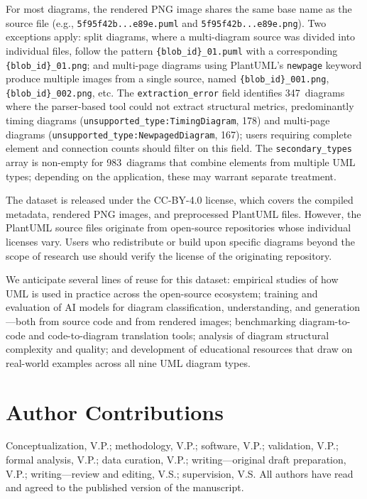 \documentclass[11pt]{article}
\begin{document}
For most diagrams, the rendered PNG image shares the same base name as the source file (e.g., \texttt{5f95f42b...e89e.puml} and \texttt{5f95f42b...e89e.png}). Two exceptions apply: split diagrams, where a multi-diagram source was divided into individual files, follow the pattern \texttt{\{blob\_id\}\_01.puml} with a corresponding \texttt{\{blob\_id\}\_01.png}; and multi-page diagrams using PlantUML's \texttt{newpage} keyword produce multiple images from a single source, named \texttt{\{blob\_id\}\_001.png}, \texttt{\{blob\_id\}\_002.png}, etc. The \texttt{extraction\_error} field identifies 347~diagrams where the parser-based tool could not extract structural metrics, predominantly timing diagrams (\texttt{unsupported\_type:TimingDiagram}, 178) and multi-page diagrams (\texttt{unsupported\_type:NewpagedDiagram}, 167); users requiring complete element and connection counts should filter on this field. The \texttt{secondary\_types} array is non-empty for 983~diagrams that combine elements from multiple UML types; depending on the application, these may warrant separate treatment.

The dataset is released under the CC-BY-4.0 license, which covers the compiled metadata, rendered PNG images, and preprocessed PlantUML files. However, the PlantUML source files originate from open-source repositories whose individual licenses vary. Users who redistribute or build upon specific diagrams beyond the scope of research use should verify the license of the originating repository.

We anticipate several lines of reuse for this dataset: empirical studies of how UML is used in practice across the open-source ecosystem; training and evaluation of AI models for diagram classification, understanding, and generation---both from source code and from rendered images; benchmarking diagram-to-code and code-to-diagram translation tools; analysis of diagram structural complexity and quality; and development of educational resources that draw on real-world examples across all nine UML diagram types.


\vspace{6pt}

\section*{Author Contributions}
Conceptualization, V.P.; methodology, V.P.; software, V.P.; validation, V.P.; formal analysis, V.P.; data curation, V.P.; writing---original draft preparation, V.P.; writing---review and editing, V.S.; supervision, V.S. All authors have read and agreed to the published version of the manuscript.
\end{document}
